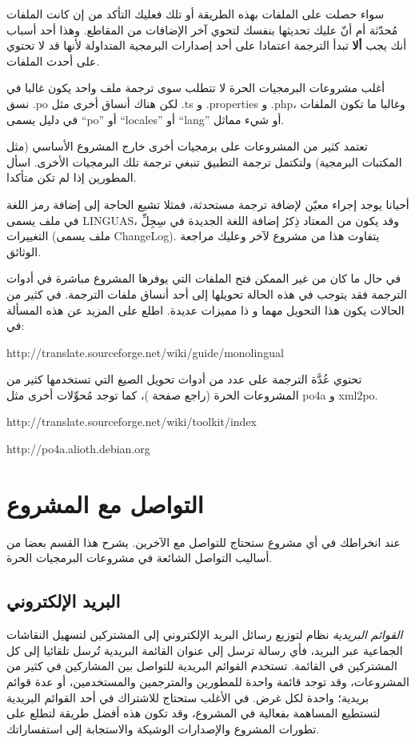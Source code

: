 سواء حصلت على الملفات بهذه الطريقة أو تلك فعليك التأكد من إن كانت
الملفات مُحدّثة أم أنّ عليك تحديثها بنفسك لتحوي آخر الإضافات من
المقاطع. وهذا أحد أسباب أنك يجب {\bf ألا} تبدأ الترجمة اعتمادا على أحد
إصدارات البرمجية المتداولة لأنها قد لا تحتوي على أحدث الملفات.

أغلب مشروعات البرمجيات الحرة لا تتطلب سوى ترجمة ملف واحد يكون غالبا في
نسق ‪.po‬ لكن هناك أنساق أخرى مثل ‪.ts‬ و ‪.properties‬ و ‪.php‬،
وغالبا ما تكون الملفات في دليل يسمى “po” أو “locales” أو “lang” أو شيء
مماثل.

تعتمد كثير من المشروعات على برمجيات أخرى خارج المشروع الأساسي (مثل
المكتبات البرمجية) ولتكتمل ترجمة التطبيق تنبغي ترجمة تلك البرمجيات
الأخرى. اسأل المطورين إذا لم تكن متأكدا.

أحيانا يوجد إجراء معيّن لإضافة ترجمة مستحدثة، فمثلا تشيع الحاجة إلى
إضافة رمز اللغة في ملف يسمى LINGUAS، وقد يكون من المعتاد ذِكرُ إضافة
اللغة الجديدة في سِجِلِّ التغييرات (ملف يسمى ChangeLog). يتفاوت هذا من
مشروع لآخر وعليك مراجعة الوثائق.

في حال ما كان من غير الممكن فتح الملفات التي يوفرها المشروع مباشرة في
أدوات الترجمة فقد يتوجب في هذه الحالة تحويلها إلى أحد أنساق ملفات
الترجمة. في كثير من الحالات يكون هذا التحويل مهما و ذا مميزات عديدة.
اطلع على المزيد عن هذه المسألة في:

http://translate.sourceforge.net/wiki/guide/monolingual

تحتوي عُدَّة الترجمة على عدد من أدوات تحويل الصيغ التي تستخدمها كثير من
المشروعات الحرة (راجع صفحة )، كما توجد
مُحوِّلات أخرى مثل po4a و xml2po.

http://translate.sourceforge.net/wiki/toolkit/index

http://po4a.alioth.debian.org

\section{التواصل مع المشروع}
عند انخراطك في أي مشروع ستحتاج للتواصل مع الآخرين. يشرح هذا القسم بعضا
من أساليب التواصل الشائعة في مشروعات البرمجيات الحرة.

\subsection{البريد الإلكتروني}
{\it القوائم البريدية} نظام لتوزيع رسائل البريد الإلكتروني إلى المشتركين
لتسهيل النقاشات الجماعية عبر البريد، فأي رسالة ترسل إلى عنوان القائمة
البريدية تُرسل تلقائيا إلى كل المشتركين في القائمة. تستخدم القوائم
البريدية للتواصل بين المشاركين في كثير من المشروعات، وقد توجد قائمة
واحدة للمطورين والمترجمين والمستخدمين، أو عدة قوائم بريدية؛ واحدة لكل
غرض. في الأغلب ستحتاج للاشتراك في أحد القوائم البريدية لتستطيع المساهمة
بفعالية في المشروع، وقد تكون هذه أفضل طريقة لتطلع على تطورات المشروع
والإصدارات الوشيكة والاستجابة إلى استفساراتك.


